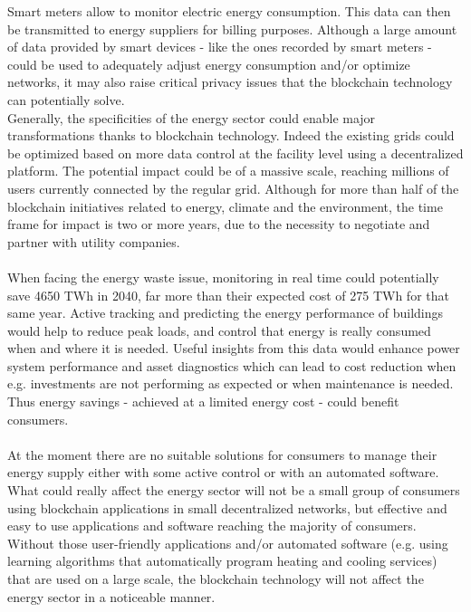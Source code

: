 \documentclass[11pt]{article}
\begin{document}
Smart meters allow to monitor electric energy consumption. This data can then be transmitted to energy suppliers for billing purposes. Although a large amount of data provided by smart devices - like the ones recorded by smart meters - could be used to adequately adjust energy consumption and/or optimize networks, it may also raise critical privacy issues \cite{4} that the blockchain technology can potentially solve.\\
Generally, the specificities of the energy sector could enable major transformations thanks to blockchain technology. Indeed the existing grids could be optimized based on more data control at the facility level using a decentralized platform. The potential impact could be of a massive scale, reaching millions of users currently connected by the regular grid. Although for more than half of the blockchain initiatives related to energy, climate and the environment, the time frame for impact is two or more years, due to the necessity to negotiate and partner with utility companies.\cite{5}\\\\
When facing the energy waste issue, monitoring in real time could potentially save 4650 TWh in 2040, far more than their expected cost of 275 TWh for that same year. Active tracking and predicting the energy performance of buildings would help to reduce peak loads, and control that energy is really consumed when and where it is needed. Useful insights from this data would enhance power system performance and asset diagnostics which can lead to cost reduction when e.g. investments are not performing as expected or when maintenance is needed. Thus energy savings - achieved at a limited energy cost - could benefit consumers.\cite{6}\\\\
At the moment there are no suitable solutions for consumers to manage their energy supply either with some active control or with an automated software. What could really affect the energy sector will not be a small group of consumers using blockchain applications in small decentralized networks, but effective and easy to use applications and software reaching the majority of consumers. Without those user-friendly applications and/or automated software (e.g. using learning algorithms that automatically program heating and cooling services) that are used on a large scale, the blockchain technology will not affect the energy sector in a noticeable manner.\cite{7}\\\\
\end{document}
